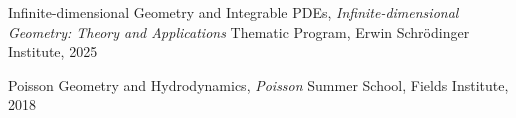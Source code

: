 \documentclass[a4paper, 12pt]{article}
\begin{document}
\begin{compactitem} \item {Infinite-dimensional Geometry and Integrable PDEs}, \emph{Infinite-dimensional Geometry: Theory and Applications} Thematic Program, Erwin Schr\"odinger Institute, 2025 \item {Poisson Geometry and Hydrodynamics}, \emph{Poisson} Summer School, Fields Institute, 2018
\end{compactitem}
\par\quad\par
%
%
%
%
\end{document}
